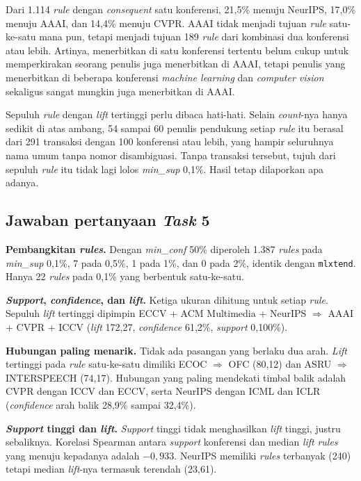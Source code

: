 Dari 1.114 \textit{rule} dengan \textit{consequent} satu konferensi, 21,5\% menuju NeurIPS, 17,0\% menuju AAAI, dan 14,4\% menuju CVPR. AAAI tidak menjadi tujuan \textit{rule} satu-ke-satu mana pun, tetapi menjadi tujuan 189 \textit{rule} dari kombinasi dua konferensi atau lebih. Artinya, menerbitkan di satu konferensi tertentu belum cukup untuk memperkirakan seorang penulis juga menerbitkan di AAAI, tetapi penulis yang menerbitkan di beberapa konferensi \textit{machine learning} dan \textit{computer vision} sekaligus sangat mungkin juga menerbitkan di AAAI.

Sepuluh \textit{rule} dengan \textit{lift} tertinggi perlu dibaca hati-hati. Selain \textit{count}-nya hanya sedikit di atas ambang, 54 sampai 60 penulis pendukung setiap \textit{rule} itu berasal dari 291 transaksi dengan 100 konferensi atau lebih, yang hampir seluruhnya nama umum tanpa nomor disambiguasi. Tanpa transaksi tersebut, tujuh dari sepuluh \textit{rule} itu tidak lagi lolos \textit{min\_sup} 0,1\%. Hasil tetap dilaporkan apa adanya.

\subsection{Jawaban pertanyaan \textit{Task} 5}
\label{sec:jawab-t5}
\textbf{Pembangkitan \textit{rules}.} Dengan \textit{min\_conf} 50\% diperoleh 1.387 \textit{rules} pada \textit{min\_sup} 0,1\%, 7 pada 0,5\%, 1 pada 1\%, dan 0 pada 2\%, identik dengan \texttt{mlxtend}. Hanya 22 \textit{rules} pada 0,1\% yang berbentuk satu-ke-satu.

\textbf{\textit{Support}, \textit{confidence}, dan \textit{lift}.} Ketiga ukuran dihitung untuk setiap \textit{rule}. Sepuluh \textit{lift} tertinggi dipimpin ECCV + ACM Multimedia + NeurIPS $\Rightarrow$ AAAI + CVPR + ICCV (\textit{lift} 172,27, \textit{confidence} 61,2\%, \textit{support} 0,100\%).

\textbf{Hubungan paling menarik.} Tidak ada pasangan yang berlaku dua arah. \textit{Lift} tertinggi pada \textit{rule} satu-ke-satu dimiliki ECOC $\Rightarrow$ OFC (80,12) dan ASRU $\Rightarrow$ INTERSPEECH (74,17). Hubungan yang paling mendekati timbal balik adalah CVPR dengan ICCV dan ECCV, serta NeurIPS dengan ICML dan ICLR (\textit{confidence} arah balik 28,9\% sampai 32,4\%).

\textbf{\textit{Support} tinggi dan \textit{lift}.} \textit{Support} tinggi tidak menghasilkan \textit{lift} tinggi, justru sebaliknya. Korelasi Spearman antara \textit{support} konferensi dan median \textit{lift} \textit{rules} yang menuju kepadanya adalah $-0{,}933$. NeurIPS memiliki \textit{rules} terbanyak (240) tetapi median \textit{lift}-nya termasuk terendah (23,61).

